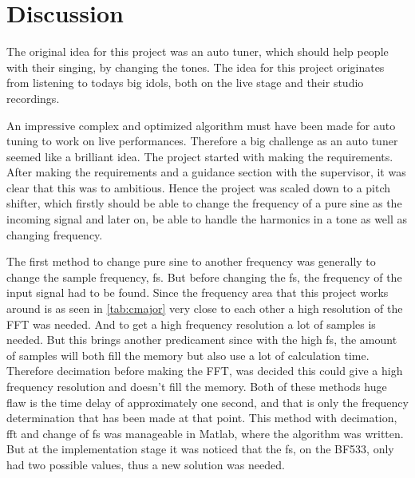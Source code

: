 
\chapter{Discussion}

The original idea for this project was an auto tuner, which should help people with their singing, by changing the tones.
The idea for this project originates from listening to todays big idols, both on the live stage and their studio recordings. 

An impressive complex and optimized algorithm must have been made for auto tuning to work on live performances. 
Therefore a big challenge as an auto tuner seemed like a brilliant idea. 
The project started with making the requirements. 
After making the requirements and a guidance section with the supervisor, it was clear that this was to ambitious. 
Hence the project was scaled down to a pitch shifter, which firstly should be able to change the frequency of a pure sine as the incoming signal and later on, be able to handle the harmonics in a tone as well as changing frequency.

The first method to change pure sine to another frequency was generally to change the sample frequency, fs. 
But before changing the fs, the frequency of the input signal had to be found. 
Since the frequency area that this project works around is as seen in \cref{tab:cmajor} very close to each other a high resolution of the FFT was needed. 
And to get a high frequency resolution a lot of samples is needed. 
But this brings another predicament since with the high fs, the amount of samples will both fill the memory but also use a lot of calculation time. 
Therefore decimation before making the FFT, was decided this could give a high frequency resolution and doesn't fill the memory. 
Both of these methods huge flaw is the time delay of approximately one second, and that is only the frequency determination that has been made at that point. 
This method with decimation, fft and change of fs was manageable in Matlab, where the algorithm was written. 
But at the implementation stage it was noticed that the fs, on the BF533, only had two possible values, thus a new solution was needed. 

